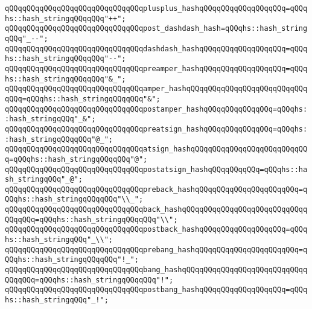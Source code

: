 \verb|qQQqqQQqqQQqqQQqqQQqqQQqqQQqqQQqplusplus_hashqQQqqQQqqQQqqQQqqQQq=qQQqhs::hash_stringqQQqqQQq"++";|\newline
\newline
\verb|qQQqqQQqqQQqqQQqqQQqqQQqqQQqqQQqpost_dashdash_hash=qQQqhs::hash_stringqQQq"_--";|\newline
\verb|qQQqqQQqqQQqqQQqqQQqqQQqqQQqqQQqdashdash_hashqQQqqQQqqQQqqQQqqQQq=qQQqhs::hash_stringqQQqqQQq"--";|\newline
\newline
\verb|qQQqqQQqqQQqqQQqqQQqqQQqqQQqqQQqpreamper_hashqQQqqQQqqQQqqQQqqQQq=qQQqhs::hash_stringqQQqqQQq"&_";|\newline
\verb|qQQqqQQqqQQqqQQqqQQqqQQqqQQqqQQqamper_hashqQQqqQQqqQQqqQQqqQQqqQQqqQQqqQQq=qQQqhs::hash_stringqQQqqQQq"&";|\newline
\verb|qQQqqQQqqQQqqQQqqQQqqQQqqQQqqQQqpostamper_hashqQQqqQQqqQQqqQQq=qQQqhs::hash_stringqQQq"_&";|\newline
\newline
\verb|qQQqqQQqqQQqqQQqqQQqqQQqqQQqqQQqpreatsign_hashqQQqqQQqqQQqqQQq=qQQqhs::hash_stringqQQqqQQq"@_";|\newline
\verb|qQQqqQQqqQQqqQQqqQQqqQQqqQQqqQQqatsign_hashqQQqqQQqqQQqqQQqqQQqqQQqqQQq=qQQqhs::hash_stringqQQqqQQq"@";|\newline
\verb|qQQqqQQqqQQqqQQqqQQqqQQqqQQqqQQqpostatsign_hashqQQqqQQqqQQq=qQQqhs::hash_stringqQQq"_@";|\newline
\newline
\verb|qQQqqQQqqQQqqQQqqQQqqQQqqQQqqQQqpreback_hashqQQqqQQqqQQqqQQqqQQqqQQq=qQQqhs::hash_stringqQQqqQQq"\\_";|\newline
\verb|qQQqqQQqqQQqqQQqqQQqqQQqqQQqqQQqback_hashqQQqqQQqqQQqqQQqqQQqqQQqqQQqqQQqqQQq=qQQqhs::hash_stringqQQqqQQq"\\";|\newline
\verb|qQQqqQQqqQQqqQQqqQQqqQQqqQQqqQQqpostback_hashqQQqqQQqqQQqqQQqqQQq=qQQqhs::hash_stringqQQq"_\\";|\newline
\newline
\verb|qQQqqQQqqQQqqQQqqQQqqQQqqQQqqQQqprebang_hashqQQqqQQqqQQqqQQqqQQqqQQq=qQQqhs::hash_stringqQQqqQQq"!_";|\newline
\verb|qQQqqQQqqQQqqQQqqQQqqQQqqQQqqQQqbang_hashqQQqqQQqqQQqqQQqqQQqqQQqqQQqqQQqqQQq=qQQqhs::hash_stringqQQqqQQq"!";|\newline
\verb|qQQqqQQqqQQqqQQqqQQqqQQqqQQqqQQqpostbang_hashqQQqqQQqqQQqqQQqqQQq=qQQqhs::hash_stringqQQq"_!";|\newline
